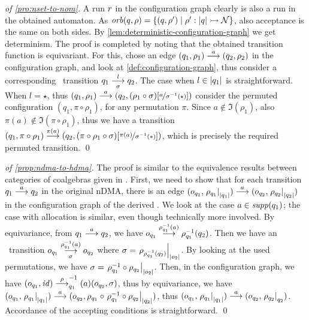 \begin{proof}[of \cref{pro:nset-to-nom}]
 A run $r$ in the configuration graph clearly is also a run in the obtained automaton. As $\mathit{orb}(q,\rho) = \{(q,\rho')\mid \rho' : |q| \rightarrowtail \mathcal{N} \}$, also acceptance is the same on both sides. By \cref{lem:deterministic-configuration-graph} we get determinism. The proof is completed by noting that the obtained transition function is equivariant. For this, chose an edge $(q_1,\rho_1) \overset{a}{\longrightarrow} (q_2,\rho_2)$ in the configuration graph, and look at \cref{def:configuration-graph}, thus consider a corresponding \hdma\ transition $q_1 \overset{l}{\underset{\sigma}{\longrightarrow}} q_2$. The case when $l \in |q_1|$ is straightforward. When $l=\star$, thus $(q_1,\rho_1) \overset{a}{\longrightarrow} (q_2,(\rho_1 \circ \sigma)[\nicefrac{a}{\sigma^{-1}(\star)}])$ consider the permuted configuration $(q_1,\pi\circ\rho_1)$,  for any permutation $\pi$. Since $a \notin \Im(\rho_1)$, also  $\pi(a) \notin \Im (\pi\circ\rho_1)$, thus we have a transition $(q_1,\pi\circ\rho_1)\overset{\pi(a)}{\longrightarrow}(q_2,(\pi \circ \rho_1\circ \sigma)[\nicefrac{\pi(a)}{\sigma^{-1}(*)}])$, which is precisely the required permuted transition. \qed
\end{proof}

 
\begin{proof}[of \cref{prop:ndma-to-hdma}]
 The proof is similar to the equivalence results between categories of coalgebras given in \cite{CianciaM10}. First, we need to show that for each transition $q_1 \overset{a}{\longrightarrow} q_2$ in the original nDMA, there is an edge $(o_{q_1},\left.\rho_{q_1}\right|_{|q_1|}) \overset{a}{\longrightarrow} (o_{q_2},\left.\rho_{q_2}\right|_{|q_2|})$ in the configuration graph of the derived \hdma. We look at the case $a \in \mathit{supp}(q_1)$; the case with allocation is similar, even though technically more involved. By equivariance, from $q_1 \overset{a}{\longrightarrow} q_2$, we have $o_{q_1} \overset{\rho^{-1}_{q_1} (a)}{\longrightarrow} \rho^{-1}_{q_1}(q_2)$. Then we have an \hdma\ transition $o_{q_1} \overset{\rho^{-1}_{q_1}(a)}{\underset{\sigma}{\longrightarrow}} o_{q_2}$ where $\sigma = \left.\rho_{\rho^{-1}_{q_1}(q_2)}\right|_{|o_2|}$. 
 By looking at the used permutations, we have $\sigma = \left.\rho^{-1}_{q_1} \circ \rho_{q_2}\right|_{|o_2|}$. 
 Then, in the configuration graph, we have $(o_{q_1},\mathit{id}) \overset{\rho}{\longrightarrow}^{-1}_{q_1}(a) (o_{q_2},\sigma)$, thus by equivariance, we have 
 $(o_{q_1},\left.\rho_{q_1}\right|_{|q_1|}) \overset{a}{\longrightarrow} (o_{q_2},\rho_{q_1} \circ 
 \left.\rho^{-1}_{q_1} \circ \rho_{q_2}\right|_{|q_2|})$, 
 thus $(o_{q_1},\left.\rho_{q_1}\right|_{|q_1|}) \overset{a}{\longrightarrow} (o_{q_2},\left.\rho_{q_2}\right|_{q_2})$. Accordance of the accepting conditions is straightforward.
 \qed
\end{proof}


